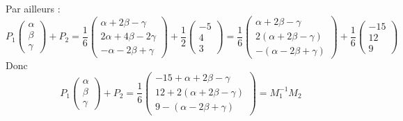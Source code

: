 \documentclass[a4paper, 11pt,reqno]{article}
\begin{document}
\begin{correction}
\begin{enumerate}
Par ailleurs : 
$$  P_1 \begin{pmatrix}
\alpha \\
\beta \\
\gamma 
\end{pmatrix} +P_2 = \frac{1}{6}\begin{pmatrix}
\alpha+2\beta -\gamma \\
2\alpha+4\beta -2\gamma \\
-\alpha-2\beta +\gamma
\end{pmatrix}
 + \frac{1}{2}\begin{pmatrix}
-5 \\
4 \\
3
\end{pmatrix}  =\frac{1}{6}\begin{pmatrix}
\alpha+2\beta -\gamma \\
2(\alpha+2\beta -\gamma) \\
-(\alpha-2\beta +\gamma) 
\end{pmatrix}
 + \frac{1}{6}\begin{pmatrix}
-15 \\
12 \\
9
\end{pmatrix} $$
Donc 
$$P_1 \begin{pmatrix}
\alpha \\
\beta \\
\gamma 
\end{pmatrix} +P_2 = \frac{1}{6}\begin{pmatrix}
-15+\alpha+2\beta -\gamma \\
12+2(\alpha+2\beta -\gamma) \\
9-(\alpha-2\beta +\gamma) 
\end{pmatrix} = M_1^{-1}M_2
$$



\end{enumerate}
\end{correction}
\end{document}
